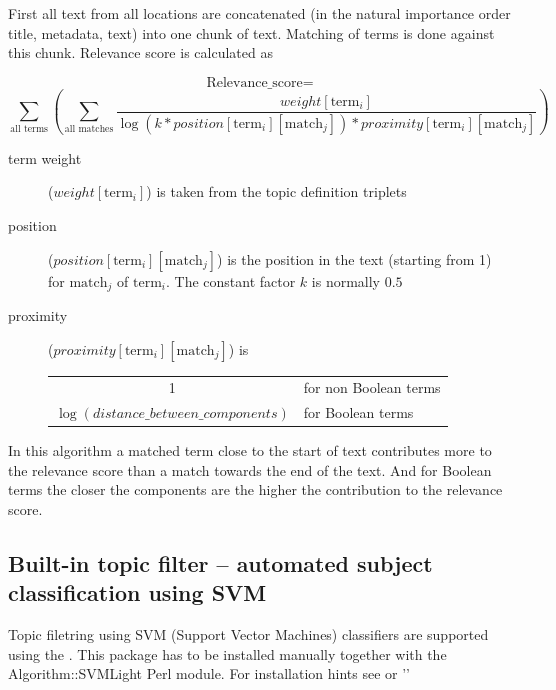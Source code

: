 First all text from all locations are concatenated (in the natural importance order
title, metadata, text) into one chunk of text. Matching of terms is done
against this chunk. Relevance score is calculated as

\vbox{
\[ \mbox{Relevance\_score} = \]
\[ \sum_{\mbox{all terms}} \left( \sum_{\mbox{all matches}}
\frac{weight[\mbox{term}_{i}]}{\log(k * position[\mbox{term}_{i}][\mbox{match}_{j}]) * proximity[\mbox{term}_{i}][\mbox{match}_{j}]} \right) \]}

\begin{description}
\item[term weight] ($weight[\mbox{term}_{i}]$) is taken from the topic
 definition triplets

\item[position] ($position[\mbox{term}_{i}][\mbox{match}_{j}]$) is the position
in the text (starting from 1) for $\mbox{match}_{j}$ of $\mbox{term}_{i}$.
The constant factor $k$ is normally $0.5$

\item[proximity] ($proximity[\mbox{term}_{i}][\mbox{match}_{j}]$) is

\begin{tabular}{cl}
 1 & for non Boolean terms\\
 $\log(distance\_between\_components)$ & for Boolean terms\\
\end{tabular}
\end{description}

In this algorithm a matched term close to the start of text contributes
more to the relevance score than a match towards the end of the
text. And for Boolean terms the closer the components are the higher
the contribution to the relevance score.

\subsection{Built-in topic filter -- automated subject classification using SVM}
Topic filetring using SVM (Support Vector Machines) classifiers are supported using the
. This package has to be
installed manually together with the Algorithm::SVMLight Perl module. For installation hints see
 or 
''

